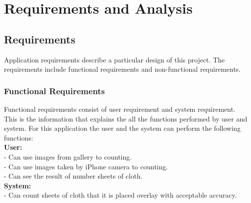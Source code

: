 
\chapter{Requirements and Analysis} %

\label{Chapter4} %



\section{Requirements}
Application requirements describe a particular design of this project. The requirements include functional requirements and non-functional requirements.

\subsection{Functional Requirements}

Functional requirements consist of user requirement and system requirement. This is the information that explains the all the functions performed by user and system. 
For this application the user and the system can perform the following functions:\\
\textbf{User:}\\
- Can use images from gallery to counting.\\
- Can use images taken by iPhone camera to counting.\\
- Can see the result of number sheets of cloth.\\
\textbf{System:}\\
- Can count sheets of cloth that it is placed overlay with acceptable accuracy.



